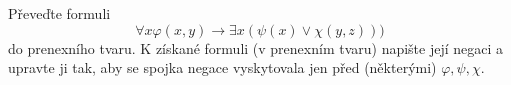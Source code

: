 Převeďte formuli $$\forall x \varphi (x,y) \rightarrow \exists x(\psi(x)\vee
\chi (y,z)))$$ do prenexního tvaru. K získané formuli (v prenexním tvaru)
napište její negaci a upravte ji tak, aby se spojka negace vyskytovala jen před
(některými) $\varphi, \psi, \chi$.
